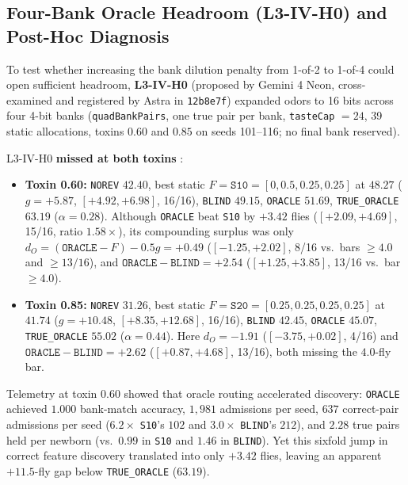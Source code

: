 \subsection{Four-Bank Oracle Headroom (L3-IV-H0) and Post-Hoc Diagnosis}

To test whether increasing the bank dilution penalty from 1-of-2 to 1-of-4 could open sufficient headroom, \textbf{L3-IV-H0} (proposed by Gemini 4 Neon, cross-examined and registered by Astra in \texttt{12b8e7f}) expanded odors to 16 bits across four 4-bit banks (\texttt{quadBankPairs}, one true pair per bank, \texttt{tasteCap} $=24$, 39 static allocations, toxins $0.60$ and $0.85$ on seeds 101--116; no final bank reserved).

L3-IV-H0 \textbf{missed at both toxins} :
\begin{itemize}
  \item \textbf{Toxin 0.60:} \texttt{NOREV} $42.40$, best static $F = \texttt{S10} = [0,0.5,0.25,0.25]$ at $48.27$ ($g = +5.87$, $[+4.92,+6.98]$, 16/16), \texttt{BLIND} $49.15$, \texttt{ORACLE} $51.69$, \texttt{TRUE\_ORACLE} $63.19$ ($\alpha = 0.28$). Although \texttt{ORACLE} beat \texttt{S10} by $+3.42$ flies ($[+2.09,+4.69]$, 15/16, ratio $1.58\times$), its compounding surplus was only $d_O = (\texttt{ORACLE}-F)-0.5g = +0.49$ ($[-1.25,+2.02]$, 8/16 vs.\ bars $\ge 4.0$ and $\ge 13/16$), and $\texttt{ORACLE}-\texttt{BLIND} = +2.54$ ($[+1.25,+3.85]$, 13/16 vs.\ bar $\ge 4.0$).
  \item \textbf{Toxin 0.85:} \texttt{NOREV} $31.26$, best static $F = \texttt{S20} = [0.25,0.25,0.25,0.25]$ at $41.74$ ($g = +10.48$, $[+8.35,+12.68]$, 16/16), \texttt{BLIND} $42.45$, \texttt{ORACLE} $45.07$, \texttt{TRUE\_ORACLE} $55.02$ ($\alpha = 0.44$). Here $d_O = -1.91$ ($[-3.75,+0.02]$, 4/16) and $\texttt{ORACLE}-\texttt{BLIND} = +2.62$ ($[+0.87,+4.68]$, 13/16), both missing the $4.0$-fly bar.
\end{itemize}
Telemetry at toxin $0.60$ showed that oracle routing accelerated discovery: \texttt{ORACLE} achieved $1.000$ bank-match accuracy, $1{,}981$ admissions per seed, $637$ correct-pair admissions per seed ($6.2\times$ \texttt{S10}'s $102$ and $3.0\times$ \texttt{BLIND}'s $212$), and $2.28$ true pairs held per newborn (vs.\ $0.99$ in \texttt{S10} and $1.46$ in \texttt{BLIND}). Yet this sixfold jump in correct feature discovery translated into only $+3.42$ flies, leaving an apparent $+11.5$-fly gap below \texttt{TRUE\_ORACLE} ($63.19$).

